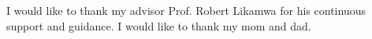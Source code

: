 	I would like to thank my advisor Prof. Robert Likamwa for his continuous support and guidance. I would like to thank my mom and dad. 

